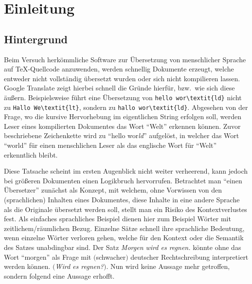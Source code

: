 \section{Einleitung}
\subsection{Hintergrund}\label{einleitung:hintergrund}
Beim Versuch herkömmliche Software zur Übersetzung von menschlicher Sprache auf \TeX{}-Quellcode anzuwenden, werden schnellig Dokumente erzeugt, welche entweder nicht vollständig übersetzt wurden oder sich nicht kompilieren lassen. Google Translate zeigt hierbei schnell die Gründe hierfür, bzw.\ wie sich diese äußern. Beispielsweise führt eine Übersetzung von \verb|hello wor\textit{ld}| nicht zu \verb|Hallo We\textit{lt}|, sondern zu \verb|hallo wor\textit{ld}|. Abgesehen von der Frage, wo die kursive Hervorhebung im eigentlichen String erfolgen soll, werden Leser eines kompilierten Dokumentes das Wort \enquote{Welt} erkennen können. Zuvor beschriebene Zeichenkette wird zu \enquote{hello wor\textit{ld}} aufgelöst, in welcher das Wort \enquote{world} für einen menschlichen Leser als das englische Wort für \enquote{Welt} erkenntlich bleibt.%
\\\noindent



Diese Tatsache scheint im ersten Augenblick nicht weiter verheerend, kann jedoch bei größeren Dokumenten einen Logikbruch hervorrufen. 
Betrachtet man \enquote{einen Übersetzer} zunächst als Konzept, mit welchem, ohne Vorwissen von den (sprachlichen) Inhalten eines Dokumentes, diese Inhalte in eine andere Sprache als die Originale übersetzt werden soll, stellt man ein Risiko des Kontextverlustes fest. Als einfaches sprachliches Beispiel dienen hier zum Beispiel Wörter mit zeitlichem/räumlichen Bezug. Einzelne Sätze schnell ihre sprachliche Bedeutung, wenn einzelne Wörter verloren gehen, welche für den Kontext oder die Semantik des Satzes unabdingbar sind. Der Satz \textit{Morgen wird es regnen.} könnte ohne das Wort \enquote{morgen} als Frage mit $($schwacher$)$ deutscher Rechtschreibung interpretiert werden können. $($\textit{Wird es regnen?}$)$. Nun wird keine Aussage mehr getroffen, sondern folgend eine Aussage erhofft.


